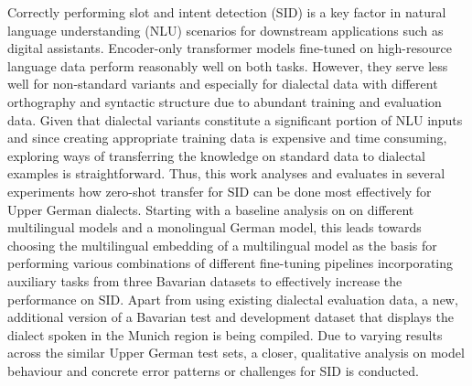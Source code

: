 \documentclass[11pt,a4paper,twoside,openright]{scrbook}
\begin{document}
\deckblatt

\pagestyle{scrheadings}



\erklaerung



\thispagestyle{scrplain}
\noindent

Correctly performing slot and intent detection (SID) is a key factor in natural language understanding (NLU) scenarios for downstream applications such as digital assistants. Encoder-only transformer models fine-tuned on high-resource language data perform reasonably well on both tasks. However, they serve less well for non-standard variants and especially for dialectal data with different orthography and syntactic structure due to abundant training and evaluation data. Given that dialectal variants constitute a significant portion of NLU inputs and since creating appropriate training data is expensive and time consuming, exploring ways of transferring the knowledge on standard data to dialectal examples is straightforward. Thus, this work analyses and evaluates in several experiments how zero-shot transfer for SID can be done most effectively for Upper German dialects. Starting with a baseline analysis on on different multilingual models and a monolingual German model, this leads towards choosing the multilingual embedding of a multilingual model as the basis for performing various combinations of different fine-tuning pipelines incorporating auxiliary tasks from three Bavarian datasets to effectively increase the performance on SID. Apart from using existing dialectal evaluation data, a new, additional version of a Bavarian test and development dataset that displays the dialect spoken in the Munich region is being compiled. Due to varying results across the similar Upper German test sets, a closer, qualitative analysis on model behaviour and concrete error patterns or challenges for SID is conducted. \\
\end{document}
